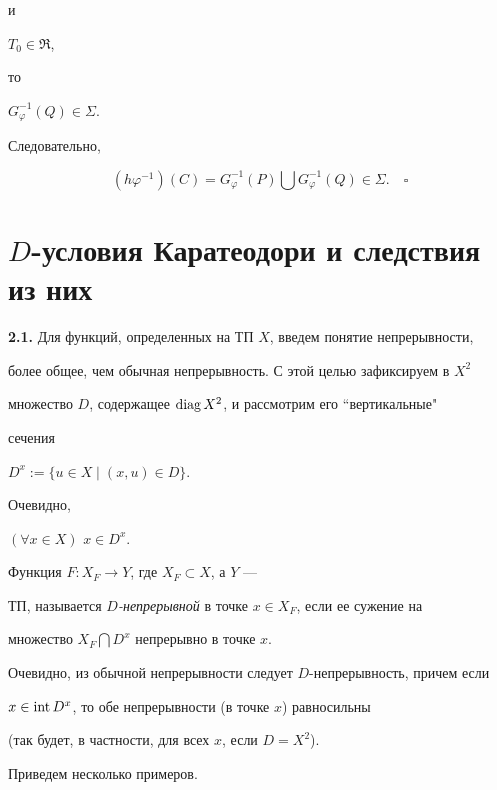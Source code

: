 и


$T_0\in\Re$,


то


$G_\varphi^{-1}(Q)\in\Sigma$.


Следовательно,


$$


(h\varphi^{-1})(C)=G_\varphi^{-1}(P)\bigcup


G_\varphi^{-1}(Q)\in\Sigma.\quad \square


$$





\section{$D$-условия Каратеодори и следствия из них}





{\bf 2.1.} Для функций, определенных на ТП $X$, введем понятие непрерывности,


более общее, чем обычная непрерывность. С этой целью зафиксируем в $X^2$


множество $D$, содержащее $\operatorname{diag} X^2$, и рассмотрим его ``вертикальные"


сечения 


$D^x :=\{u\in X \mid (x,u)\in D\}$.


Очевидно,


$(\forall x\in X)$ $x\in D^x$.





\begin{defns} Функция $F:X_F\to Y$, где $X_F\subset X$, а $Y$ ---


ТП, называется {\em $D$-непрерывной} в точке $x\in X_F$, если ее сужение на


множество $X_F\bigcap D^x$ непрерывно в точке $x$.


\end{defns}





Очевидно, из обычной непрерывности следует $D$-непрерывность, причем если


$x\in\operatorname{int} D^x$, то обе непрерывности (в точке $x$) равносильны


(так будет, в частности, для всех $x$, если $D=X^2$).





Приведем несколько примеров.





